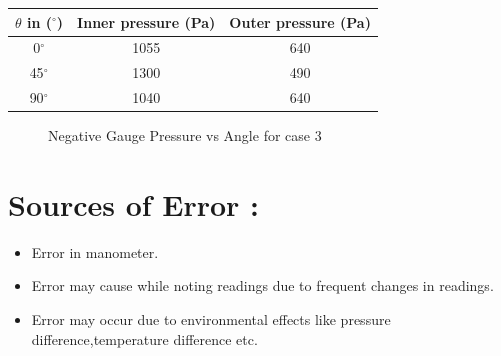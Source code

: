 \documentclass[12pt,a4paper]{article}
\begin{document}
\begin{center}
\begin{tabular}{ |c|c|c| } 
 \hline
 \textbf{$\theta$ in ($^{\circ}$)} & \textbf{Inner pressure (Pa)} & \textbf{Outer pressure (Pa)} \\ 
 \hline
0$^{\circ}$ & 1055 & 640 \\ 
 \hline
 45$^{\circ}$ & 1300 & 490 \\ 
 \hline
90$^{\circ}$ & 1040 & 640 \\ 
 \hline
\end{tabular}
\end{center}
\begin{figure}[!ht]
	\begin{center}
	\end{center}
	\caption{Negative Gauge Pressure vs Angle for case 3}
\end{figure}
\newpage

\section{Sources of Error :}
\begin{itemize}
    \item Error in manometer.
    \item Error may cause while noting readings due to frequent changes in readings.
    \item Error may occur due to environmental effects like pressure difference,temperature difference etc.
\end{itemize}
\end{document}
